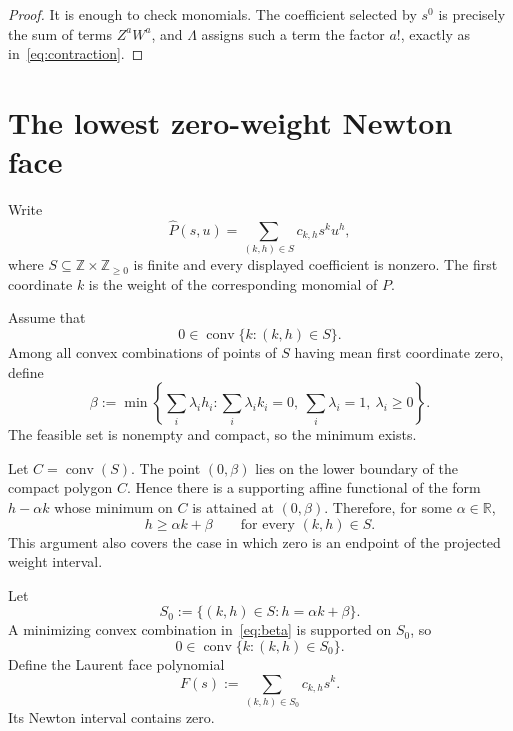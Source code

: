 \documentclass[11pt]{article}
\theoremstyle{remark}
\newcommand{\Z}{\mathbb Z}
\newcommand{\conv}{\operatorname{conv}}
\begin{document}
\begin{proof}
It is enough to check monomials. The coefficient selected by $s^0$ is precisely the sum of terms $Z^aW^a$, and $\Lambda$ assigns such a term the factor $a!$, exactly as in~\eqref{eq:contraction}.
\end{proof}

\section{The lowest zero-weight Newton face}

Write
\begin{equation}\label{eq:support}
\widehat P(s,u)
=
\sum_{(k,h)\in S}c_{k,h}s^ku^h,
\end{equation}
where $S\subseteq\Z\times\Z_{\ge0}$ is finite and every displayed coefficient is nonzero. The first coordinate $k$ is the weight of the corresponding monomial of $P$.

Assume that
\begin{equation}\label{eq:zero-conv}
0\in\conv\{k:(k,h)\in S\}.
\end{equation}
Among all convex combinations of points of $S$ having mean first coordinate zero, define
\begin{equation}\label{eq:beta}
\beta
:=
\min\left\{
\sum_i\lambda_i h_i:
\sum_i\lambda_i k_i=0,
\ \sum_i\lambda_i=1,
\ \lambda_i\ge0
\right\}.
\end{equation}
The feasible set is nonempty and compact, so the minimum exists.

Let $C=\conv(S)$. The point $(0,\beta)$ lies on the lower boundary of the compact polygon $C$. Hence there is a supporting affine functional of the form $h-\alpha k$ whose minimum on $C$ is attained at $(0,\beta)$. Therefore, for some $\alpha\in\mathbb R$,
\begin{equation}\label{eq:support-line}
h\ge \alpha k+\beta
\qquad
\text{for every }(k,h)\in S.
\end{equation}
This argument also covers the case in which zero is an endpoint of the projected weight interval.

Let
\[
S_0
:=
\{(k,h)\in S:h=\alpha k+\beta\}.
\]
A minimizing convex combination in~\eqref{eq:beta} is supported on $S_0$, so
\begin{equation}\label{eq:face-crosses}
0\in\conv\{k:(k,h)\in S_0\}.
\end{equation}
Define the Laurent face polynomial
\begin{equation}\label{eq:F}
F(s)
:=
\sum_{(k,h)\in S_0}c_{k,h}s^k.
\end{equation}
Its Newton interval contains zero.
\end{document}

